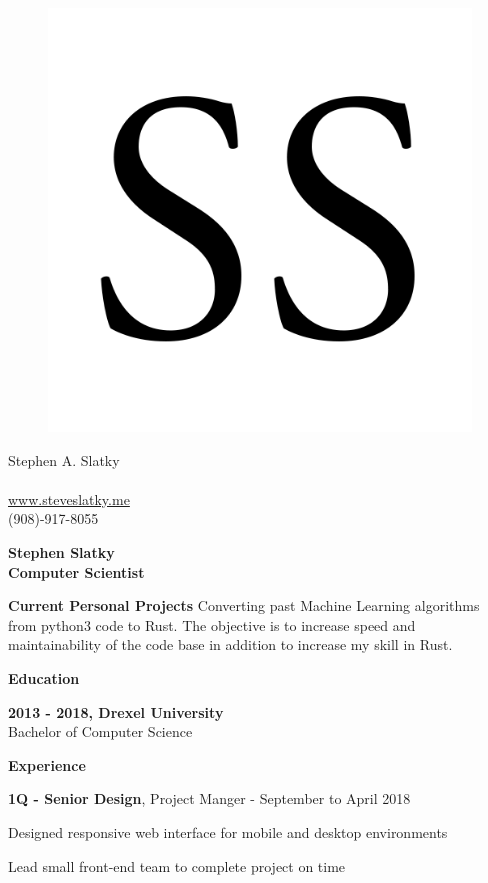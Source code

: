 \documentclass[a4paper,12pt,final]{memoir}
\newcommand{\Sep}{\vspace{1.4em}}
\newcommand{\SmallSep}{\vspace{0.5em}}
\newenvironment{CurrentProject}
	{\ignorespaces\textbf{\color{RoyalBlue} Current Personal Projects}}
	{\Sep\ignorespacesafterend}
\newcommand{\CVSection}[1]
	{\Large\textbf{#1}\par
	\SmallSep\normalsize\normalfont}
\newcommand{\CVItem}[1]
	{\textbf{\color{RoyalBlue} #1}}
\begin{document}
\begin{figure}
	\hfill
	\includegraphics[width=0.6\columnwidth]{SS.png}
	\vspace{-7cm}
\end{figure}

\begin{flushright}\small
	Stephen A. Slatky \\
	  \\
	\url{www.steveslatky.me} \\
	(908)-917-8055
\end{flushright}\normalsize
\framebreak


\Huge\bfseries {\color{RoyalBlue} Stephen Slatky} \\
\Large\bfseries  Computer Scientist \\

\normalsize\normalfont

\begin{CurrentProject}
Converting past Machine Learning algorithms from python3 code to 
Rust. The objective is to increase speed and maintainability of 
the code base in addition to increase my skill in Rust. 
\end{CurrentProject}

\CVSection{Education}
\CVItem{2013 - 2018, Drexel University}\\
Bachelor of Computer Science
\Sep

\CVSection{Experience}

\CVItem{1Q - Senior Design}{, Project Manger -}{ September to  April 2018}
\begin{compactitem}[\color{RoyalBlue}$\circ$]
    \item Designed responsive web interface for mobile and desktop environments
    \item Lead small front-end team to complete project on time 
\end{compactitem}
\SmallSep
\end{document}
